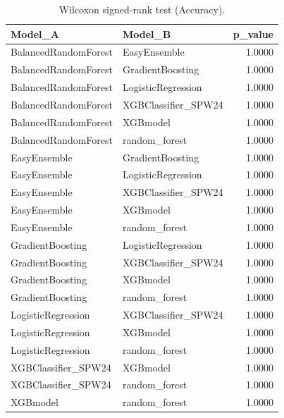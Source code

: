 \begin{table}[t]
\centering
\begin{tabular}{llr}
\toprule
Model_A & Model_B & p_value \\
\midrule
BalancedRandomForest & EasyEnsemble & 1.0000 \\
BalancedRandomForest & GradientBoosting & 1.0000 \\
BalancedRandomForest & LogisticRegression & 1.0000 \\
BalancedRandomForest & XGBClassifier_SPW24 & 1.0000 \\
BalancedRandomForest & XGBmodel & 1.0000 \\
BalancedRandomForest & random_forest & 1.0000 \\
EasyEnsemble & GradientBoosting & 1.0000 \\
EasyEnsemble & LogisticRegression & 1.0000 \\
EasyEnsemble & XGBClassifier_SPW24 & 1.0000 \\
EasyEnsemble & XGBmodel & 1.0000 \\
EasyEnsemble & random_forest & 1.0000 \\
GradientBoosting & LogisticRegression & 1.0000 \\
GradientBoosting & XGBClassifier_SPW24 & 1.0000 \\
GradientBoosting & XGBmodel & 1.0000 \\
GradientBoosting & random_forest & 1.0000 \\
LogisticRegression & XGBClassifier_SPW24 & 1.0000 \\
LogisticRegression & XGBmodel & 1.0000 \\
LogisticRegression & random_forest & 1.0000 \\
XGBClassifier_SPW24 & XGBmodel & 1.0000 \\
XGBClassifier_SPW24 & random_forest & 1.0000 \\
XGBmodel & random_forest & 1.0000 \\
\bottomrule
\end{tabular}
\caption{Wilcoxon signed-rank test (Accuracy).}
\label{tab:wilcoxon_Accuracy}
\end{table}